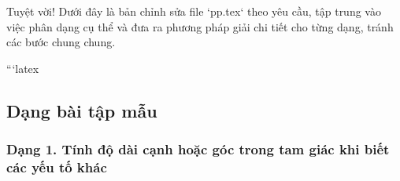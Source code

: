 

Tuyệt vời! Dưới đây là bản chỉnh sửa file `pp.tex` theo yêu cầu, tập trung vào việc phân dạng cụ thể và đưa ra phương pháp giải chi tiết cho từng dạng, tránh các bước chung chung.

```latex
\subsection{Dạng bài tập mẫu}

\subsubsection{Dạng 1. Tính độ dài cạnh hoặc góc trong tam giác khi biết các yếu tố khác}
